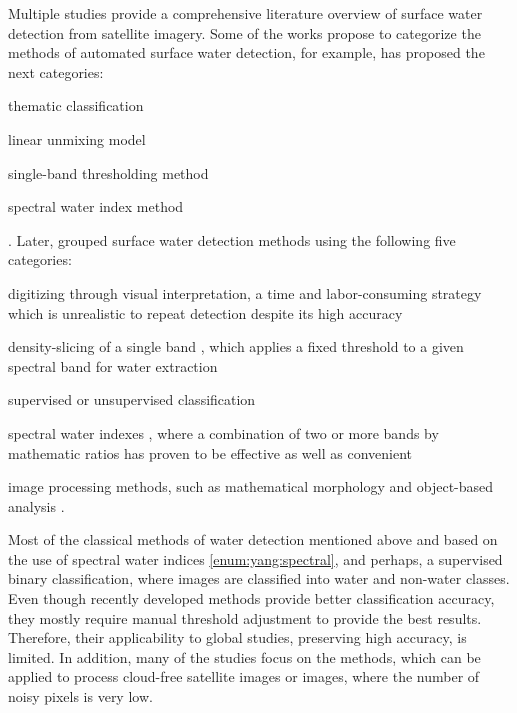 Multiple studies provide a comprehensive literature overview of surface water detection from satellite imagery. Some of the works propose to categorize the methods of automated surface water detection, for example, \citep{Ji2009} has proposed the next categories:
\begin{enumerate*}[label=(\emph{\alph*})]
	\item \label {enum:ji:thematic} thematic classification \citep{lira2006segmentation}
	\item \label {enum:ji:unmixing} linear unmixing model \citep{sethre2005remote}
	\item \label {enum:ji:th} single-band thresholding method \citep{jain2005delineation}
	\item \label {enum:ji:specral} spectral water index method \citep{McFeeters1996, Xu2006, feyisa2014automated, hoberg2015conditional, fisher2016comparing}
\end{enumerate*}. Later, \citep{yang2015landsat} grouped surface water detection methods using the following five categories: 
\begin{enumerate*}[label=(\emph{\alph*})]
	\item \label {enum:yang:manual} digitizing through visual interpretation, a time and labor-consuming strategy which is unrealistic to repeat detection despite its high accuracy
	\item \label {enum:yang:single} density-slicing of a single band \citep{frazier2000water, ryu2002waterline, white1999monitoring}, which applies a fixed threshold to a given spectral band for water extraction
	\item \label {enum:yang:ml} supervised or unsupervised classification
	\item \label {enum:yang:spectral} spectral water indexes \citep{McFeeters1996, Xu2006, hoberg2015conditional, fisher2016comparing}, where a combination of two or more bands by mathematic ratios has proven to be effective as well as convenient
	\item \label {enum:yang:im} image processing methods, such as mathematical morphology and object-based analysis \citep{blaschke2010object, lira2006segmentation, yang2015landsat}.
\end{enumerate*} 

Most of the classical methods of water detection mentioned above and based on the use of spectral water indices \ref{enum:yang:spectral}, and perhaps, a supervised binary classification, where images are classified into water and non-water classes. Even though recently developed methods provide better classification accuracy, they mostly require manual threshold adjustment to provide the best results. Therefore, their applicability to global studies, preserving high accuracy, is limited. In addition, many of the studies focus on the methods, which can be applied to process cloud-free satellite images or images, where the number of noisy pixels is very low.

